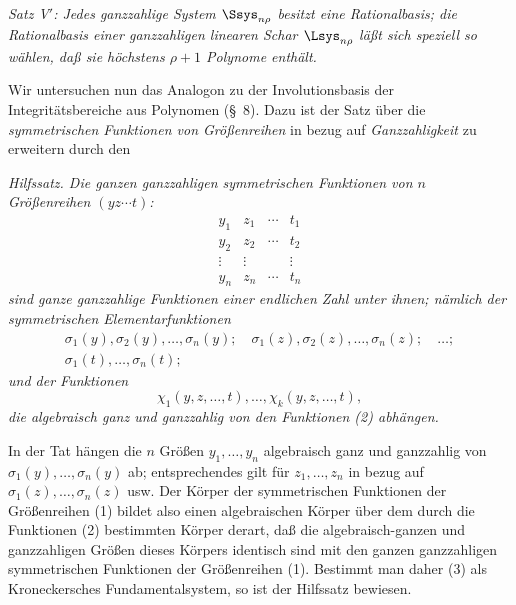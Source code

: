 \documentclass[11pt]{article}
\begin{document}
\emph{Satz V$'$: Jedes ganzzahlige System $\Ssys_{n\rho}$ besitzt eine Rationalbasis; die Rationalbasis einer ganzzahligen linearen Schar $\Lsys_{n\rho}$ läßt sich speziell so wählen, daß sie höchstens $\rho+1$ Polynome enthält.}

Wir untersuchen nun das Analogon zu der Involutionsbasis der Integritätsbereiche aus Polynomen (\S\ 8). Dazu ist der Satz über die \emph{symmetrischen Funktionen von Größenreihen} in bezug auf \emph{Ganzzahligkeit} zu erweitern durch den

\emph{Hilfssatz. Die ganzen ganzzahligen symmetrischen Funktionen von $n$ Größenreihen $(yz\cdots t)$:}
\begin{equation}
\begin{array}{cccc}
  y_1&z_1&\cdots&t_1\\
  y_2&z_2&\cdots&t_2\\
  \vdots&\vdots&&\vdots\\
  y_n&z_n&\cdots&t_n
\end{array}
\tag{1}
\end{equation}
\emph{sind ganze ganzzahlige Funktionen einer endlichen Zahl unter ihnen; nämlich der symmetrischen Elementarfunktionen}
\begin{equation}
\begin{gathered}
  \sigma_1(y),\sigma_2(y),\ldots,\sigma_n(y);\quad
  \sigma_1(z),\sigma_2(z),\ldots,\sigma_n(z);\quad\ldots;\\
  \sigma_1(t),\ldots,\sigma_n(t);
\end{gathered}
\tag{2}
\end{equation}
\emph{und der Funktionen}
\begin{equation}
  \chi_1(y,z,\ldots,t),\ldots,\chi_k(y,z,\ldots,t),
\tag{3}
\end{equation}
\emph{die algebraisch ganz und ganzzahlig von den Funktionen (2) abhängen.}

In der Tat hängen die $n$ Größen $y_1,
\ldots,y_n$ algebraisch ganz und ganzzahlig von $\sigma_1(y),
\ldots,\sigma_n(y)$ ab; entsprechendes gilt für $z_1,
\ldots,z_n$ in bezug auf $\sigma_1(z),
\ldots,\sigma_n(z)$ usw. Der Körper der symmetrischen Funktionen der Größenreihen (1) bildet also einen algebraischen Körper über dem durch die Funktionen (2) bestimmten Körper derart, daß die algebraisch-ganzen und ganzzahligen Größen dieses Körpers identisch sind mit den ganzen ganzzahligen symmetrischen Funktionen der Größenreihen (1). Bestimmt man daher (3) als Kroneckersches Fundamentalsystem, so ist der Hilfssatz bewiesen.
\end{document}

